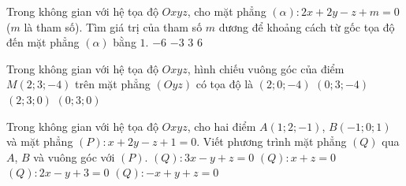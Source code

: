 \begin{ex}%
	Trong không gian với hệ tọa độ $Oxyz$, cho mặt phẳng $(\alpha)\colon 2x+2y-z+m=0$ ($m$ là tham số). Tìm giá trị của tham số $m$ dương để khoảng cách từ gốc tọa độ đến mặt phẳng $(\alpha)$ bằng $1$.
	\choice
	{$-6$}
	{$-3$}
	{\True $3$}
	{$6$}
\end{ex}

\begin{ex}%
	Trong không gian với hệ tọa độ $Oxyz$, hình chiếu vuông góc của điểm $M(2;3;-4)$ trên mặt phẳng $(Oyz)$ có tọa độ là
	\choice
	{$(2;0;-4)$}
	{\True $(0;3;-4)$}
	{$(2;3;0)$}
	{$(0;3;0)$}
\end{ex}

\begin{ex}%
	Trong không gian với hệ tọa độ $Oxyz$, cho hai điểm $A(1;2;-1)$, $B(-1;0;1)$ và mặt phẳng $(P)\colon x+2y-z+1=0$. Viết phương trình mặt phẳng $(Q)$ qua $A$, $B$ và vuông góc với $(P)$.
	\choice
	{$(Q)\colon 3x-y+z=0$}
	{\True $(Q)\colon x+z=0$}
	{$(Q)\colon 2x-y+3=0$}
	{$(Q)\colon -x+y+z=0$}
\end{ex}

